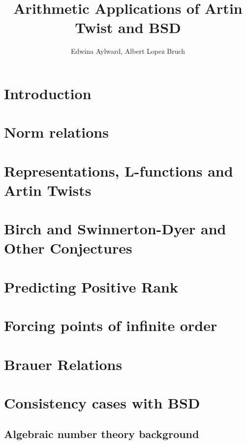 \documentclass{article}
\title{Arithmetic Applications of Artin Twist and BSD}
\author{Edwina Aylward, Albert Lopez Bruch}
\theoremstyle{plain}
\theoremstyle{definition}
\begin{document}
	\maketitle
	\newpage
	\tableofcontents
	\newpage

\section*{Introduction}


\newpage
\section{Norm relations}



\newpage
\section{Representations, L-functions and Artin Twists}


\section{Birch and Swinnerton-Dyer and Other Conjectures}


\section{Predicting Positive Rank}


\newpage
\section{Forcing points of infinite order}



\section{Brauer Relations}

\newpage
\section{Consistency cases with BSD}


\begin{appendices}
\section{Algebraic number theory background}


\end{appendices}

\newpage



\end{document}
